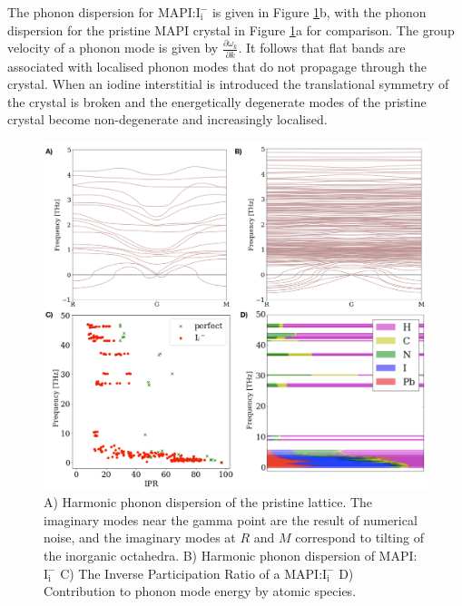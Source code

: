 The phonon dispersion for MAPI:$\mathrm{I}_\mathrm{i}^-$ is given in Figure \ref{defect_dispersion_IPR}b, with the phonon dispersion for the pristine MAPI crystal in Figure \ref{defect_dispersion_IPR}a for comparison.
The group velocity of a phonon mode is given by $\frac{\partial \omega_k}{\partial k}$. It follows that flat bands are associated with localised phonon modes that do not propagage through the crystal. 
When an iodine interstitial is introduced the translational symmetry of the crystal is broken and the energetically degenerate modes of the pristine crystal become non-degenerate and increasingly localised.

\begin{figure}[h!]   
\centering
  \includegraphics[width=1.0\columnwidth]{figures/ch6/defect_dispersion_IPR.png}
  \caption[Phonon dispersion and Inverse Participation Ratio of $\mathrm{I}_\mathrm{i}^{-}$]{A) Harmonic phonon dispersion of the pristine lattice. The imaginary modes near the gamma point are the result of numerical noise, and the imaginary modes at $R$ and $M$ correspond to tilting of the inorganic octahedra. B) Harmonic phonon dispersion of MAPI:$\mathrm{I}_\textrm{i}^{-}$ C) The Inverse Participation Ratio of a MAPI:$\mathrm{I}_\textrm{i}^{-}$ D) Contribution to phonon mode energy by atomic species.}
\label{defect_dispersion_IPR}
\end{figure}

